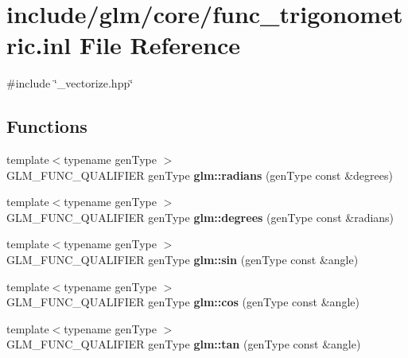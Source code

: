 \hypertarget{func__trigonometric_8inl}{\section{include/glm/core/func\-\_\-trigonometric.inl \-File \-Reference}
\label{func__trigonometric_8inl}
}
{\ttfamily \#include \char`\"{}\-\_\-vectorize.\-hpp\char`\"{}}\*
\subsection*{\-Functions}
\begin{DoxyCompactItemize}
\item 
\hypertarget{namespaceglm_aab8707b5bcc6df3ae66ce18c29195eb0}{{\footnotesize template$<$typename gen\-Type $>$ }\\\-G\-L\-M\-\_\-\-F\-U\-N\-C\-\_\-\-Q\-U\-A\-L\-I\-F\-I\-E\-R gen\-Type {\bfseries glm\-::radians} (gen\-Type const \&degrees)}\label{namespaceglm_aab8707b5bcc6df3ae66ce18c29195eb0}

\item 
\hypertarget{namespaceglm_a60dd1befdaa8cd480677cb81d5d08a15}{{\footnotesize template$<$typename gen\-Type $>$ }\\\-G\-L\-M\-\_\-\-F\-U\-N\-C\-\_\-\-Q\-U\-A\-L\-I\-F\-I\-E\-R gen\-Type {\bfseries glm\-::degrees} (gen\-Type const \&radians)}\label{namespaceglm_a60dd1befdaa8cd480677cb81d5d08a15}

\item 
\hypertarget{namespaceglm_af44ff2b464785b28b54d4a1257d63e4e}{{\footnotesize template$<$typename gen\-Type $>$ }\\\-G\-L\-M\-\_\-\-F\-U\-N\-C\-\_\-\-Q\-U\-A\-L\-I\-F\-I\-E\-R gen\-Type {\bfseries glm\-::sin} (gen\-Type const \&angle)}\label{namespaceglm_af44ff2b464785b28b54d4a1257d63e4e}

\item 
\hypertarget{namespaceglm_adf4d85a926e82a1611786f1e027c2f83}{{\footnotesize template$<$typename gen\-Type $>$ }\\\-G\-L\-M\-\_\-\-F\-U\-N\-C\-\_\-\-Q\-U\-A\-L\-I\-F\-I\-E\-R gen\-Type {\bfseries glm\-::cos} (gen\-Type const \&angle)}\label{namespaceglm_adf4d85a926e82a1611786f1e027c2f83}

\item 
\hypertarget{namespaceglm_a7902142ebcf95d565448ab7d5de296ce}{{\footnotesize template$<$typename gen\-Type $>$ }\\\-G\-L\-M\-\_\-\-F\-U\-N\-C\-\_\-\-Q\-U\-A\-L\-I\-F\-I\-E\-R gen\-Type {\bfseries glm\-::tan} (gen\-Type const \&angle)}\label{namespaceglm_a7902142ebcf95d565448ab7d5de296ce}


\end{DoxyCompactItemize}
